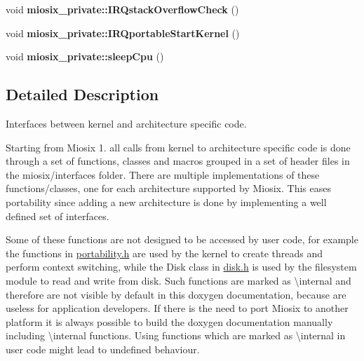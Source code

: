 \begin{DoxyCompactItemize}
\item 
\hypertarget{group___interfaces_ga9702b5fb892928b5a330ffedda094d2b}{void {\bfseries miosix\-\_\-private\-::\-I\-R\-Qstack\-Overflow\-Check} ()}\label{group___interfaces_ga9702b5fb892928b5a330ffedda094d2b}

\item 
\hypertarget{group___interfaces_gae4130aa3e4b9ba0666de5e86b2242a95}{void {\bfseries miosix\-\_\-private\-::\-I\-R\-Qportable\-Start\-Kernel} ()}\label{group___interfaces_gae4130aa3e4b9ba0666de5e86b2242a95}

\item 
\hypertarget{group___interfaces_ga38787e05f2b382978b829168c039ff0e}{void {\bfseries miosix\-\_\-private\-::sleep\-Cpu} ()}\label{group___interfaces_ga38787e05f2b382978b829168c039ff0e}

\end{DoxyCompactItemize}


\subsection{Detailed Description}
Interfaces between kernel and architecture specific code.

Starting from Miosix 1. all calls from kernel to architecture specific code is done through a set of functions, classes and macros grouped in a set of header files in the miosix/interfaces folder. There are multiple implementations of these functions/classes, one for each architecture supported by Miosix. This eases portability since adding a new architecture is done by implementing a well defined set of interfaces.

Some of these functions are not designed to be accessed by user code, for example the functions in \hyperlink{portability_8h}{portability.\-h} are used by the kernel to create threads and perform context switching, while the Disk class in \hyperlink{disk_8h}{disk.\-h} is used by the filesystem module to read and write from disk. Such functions are marked as \textbackslash{}internal and therefore are not visible by default in this doxygen documentation, because are useless for application developers. If there is the need to port Miosix to another platform it is always possible to build the doxygen documentation manually including \textbackslash{}internal functions. Using functions which are marked as \textbackslash{}internal in user code might lead to undefined behaviour. 

